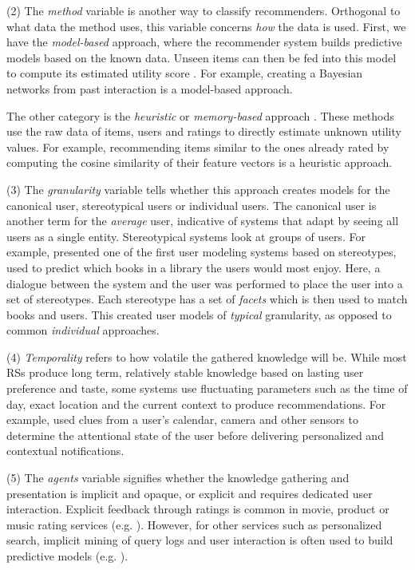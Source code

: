 (2) The \emph{method} variable is another way to classify recommenders. Orthogonal to what data the method uses, this variable
concerns \emph{how} the data is used.
First, we have the \emph{model-based} approach, where the recommender system builds predictive models based on the known data. 
Unseen items can then be fed into this model to compute its estimated utility score
\cite[p5]{Adomavicius2005}. 
For example, creating a Bayesian networks from past interaction is a model-based approach.

The other category is the \emph{heuristic} or \emph{memory-based} approach \cite[p5]{Adomavicius2005}. 
These methods use the raw data of items, users and ratings to directly estimate unknown utility values. 
For example, recommending items similar to the ones already rated by computing the cosine similarity of their feature vectors is a heuristic approach.

(3) The \emph{granularity} variable tells whether this approach creates models for the canonical user, stereotypical users or individual users. 
The canonical user is another term for the \emph{average} user, indicative of systems that adapt by seeing all users as a single entity. 
Stereotypical systems look at groups of users. 
For example, \cite{Rich1979} presented one of the first user modeling systems based on stereotypes, 
used to predict which books in a library the users would most enjoy.
Here, a dialogue between the system and the user was performed to place the user into a set of stereotypes. 
Each stereotype has a set of \emph{facets} which is then used to match books and users.
This created user models of \emph{typical} granularity, as opposed to common \emph{individual} approaches.

(4) \emph{Temporality} refers to how volatile the gathered knowledge will be.
While most RSs produce long term, relatively stable knowledge based on lasting user preference and taste, 
some systems use fluctuating parameters such as the time of day, exact location and the current context to produce recommendations.
For example, \cite{Horvitz} used clues from a user's calendar, camera and other sensors to determine the attentional state
of the user before delivering personalized and contextual notifications.

(5) The \emph{agents} variable signifies whether the knowledge gathering and presentation is implicit and opaque, 
or explicit and requires dedicated user interaction. Explicit feedback through ratings is 
common in movie, product or music rating services (e.g. \cite{Bell2007, Basu1998, Hotho}). 
However, for other services such as personalized search,
implicit mining of query logs and user interaction is often used to build predictive models 
(e.g. \cite{Shen2005, Agichtein2006, Speretta2000, Teevan2005}).



